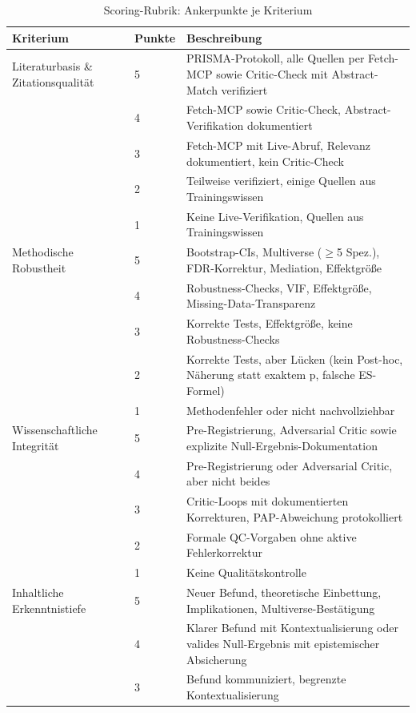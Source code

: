 \documentclass[11pt,a4paper]{article}
\begin{document}
\begin{table}[h]
\centering
\caption{Scoring-Rubrik: Ankerpunkte je Kriterium}
\label{tab:rubrik}
\footnotesize
\renewcommand{\arraystretch}{0.85}
\begin{tabular}{p{2.8cm}p{1.3cm}p{9cm}}
\toprule
\textbf{Kriterium} & \textbf{Punkte} & \textbf{Beschreibung} \\
\midrule
Literaturbasis \& Zitationsqualität
  & 5 & PRISMA-Protokoll, alle Quellen per Fetch-MCP sowie Critic-Check mit Abstract-Match verifiziert \\
  & 4 & Fetch-MCP sowie Critic-Check, Abstract-Verifikation dokumentiert \\
  & 3 & Fetch-MCP mit Live-Abruf, Relevanz dokumentiert, kein Critic-Check \\
  & 2 & Teilweise verifiziert, einige Quellen aus Trainingswissen \\
  & 1 & Keine Live-Verifikation, Quellen aus Trainingswissen \\
\midrule
Methodische Robustheit
  & 5 & Bootstrap-CIs, Multiverse ($\geq$5 Spez.), FDR-Korrektur, Mediation, Effektgröße \\
  & 4 & Robustness-Checks, VIF, Effektgröße, Missing-Data-Transparenz \\
  & 3 & Korrekte Tests, Effektgröße, keine Robustness-Checks \\
  & 2 & Korrekte Tests, aber Lücken (kein Post-hoc, Näherung statt exaktem p, falsche ES-Formel) \\
  & 1 & Methodenfehler oder nicht nachvollziehbar \\
\midrule
Wissenschaftliche Integrität
  & 5 & Pre-Registrierung, Adversarial Critic sowie explizite Null-Ergebnis-Dokumentation \\
  & 4 & Pre-Registrierung oder Adversarial Critic, aber nicht beides \\
  & 3 & Critic-Loops mit dokumentierten Korrekturen, PAP-Abweichung protokolliert \\
  & 2 & Formale QC-Vorgaben ohne aktive Fehlerkorrektur \\
  & 1 & Keine Qualitätskontrolle \\
\midrule
Inhaltliche Erkenntnistiefe
  & 5 & Neuer Befund, theoretische Einbettung, Implikationen, Multiverse-Bestätigung \\
  & 4 & Klarer Befund mit Kontextualisierung oder valides Null-Ergebnis mit epistemischer Absicherung \\
  & 3 & Befund kommuniziert, begrenzte Kontextualisierung \\

\end{tabular}
\end{table}
\end{document}
